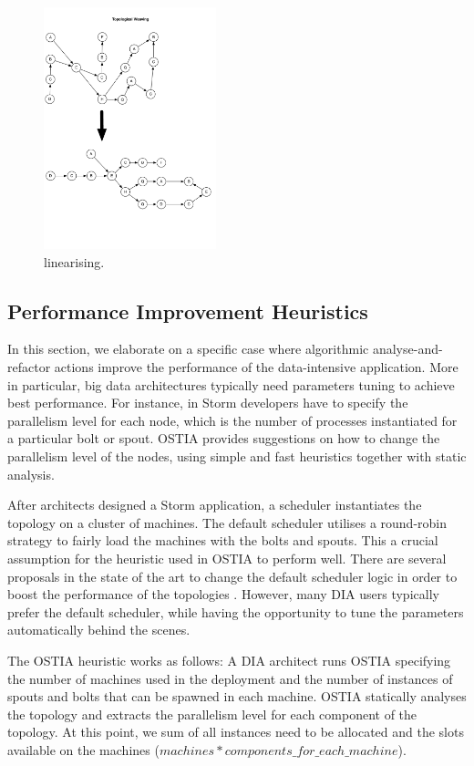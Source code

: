 \begin{figure}
	\begin{center}
		\includegraphics[width=5cm]{images/linearizing}
		\caption{linearising.}
		\label{fig:linearizing}
	\end{center}
\end{figure}

\subsection{Performance Improvement Heuristics}
\label{sec:performance-boosting}
In this section, we elaborate on a specific case where algorithmic analyse-and-refactor actions improve the performance of the data-intensive application. More in particular, big data architectures typically need parameters tuning to achieve best
performance. For instance, in Storm developers have to specify the parallelism
level for each node, which is the number of processes instantiated for a
particular bolt or spout. OSTIA provides suggestions on how to change the
parallelism level of the nodes, using simple and fast heuristics together with
static analysis.

After architects designed a Storm application, a scheduler instantiates the
topology on a cluster of machines. The default scheduler utilises a round-robin
strategy to fairly load the machines with the bolts and spouts. This a crucial
assumption for the heuristic used in OSTIA to perform well. There are several
proposals in the state of the art to change the default scheduler logic in order to boost the performance of the topologies \cite{Aniello2013Adaptive, R-Storm2015Peng}. However, many DIA users typically prefer the default scheduler, while having the opportunity to tune the parameters automatically behind the scenes.

The OSTIA heuristic works as follows: A DIA architect runs OSTIA specifying the
number of machines used in the deployment and the number of instances of spouts
and bolts that can be spawned in each machine. OSTIA statically analyses the
topology and extracts the parallelism level for each component of the
topology. At this point, we sum of all instances need to be allocated and the
slots available on the machines ($machines * components\_for\_each\_machine$).

